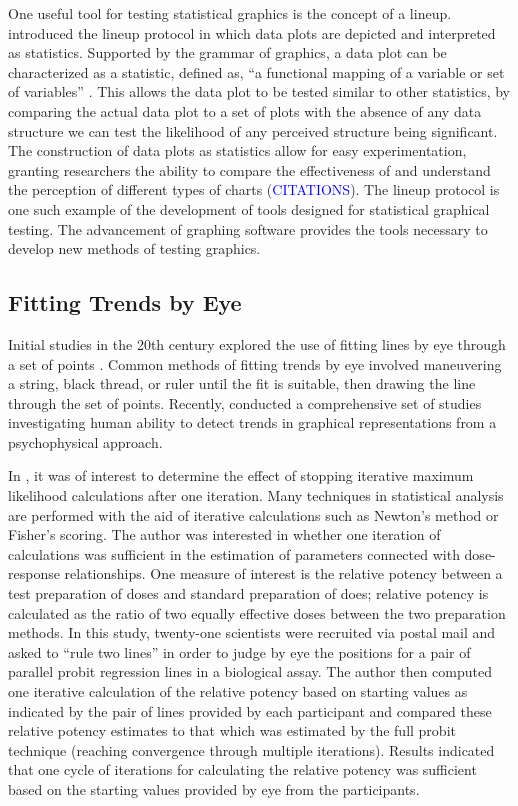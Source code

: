 \documentclass[12pt]{article}
\begin{document}
One useful tool for testing statistical graphics is the concept of a
lineup. \citet{buja2009statistical} introduced the lineup protocol in
which data plots are depicted and interpreted as statistics. Supported
by the grammar of graphics, a data plot can be characterized as a
statistic, defined as, ``a functional mapping of a variable or set of
variables'' \citep{vanderplas2020testing}. This allows the data plot to
be tested similar to other statistics, by comparing the actual data plot
to a set of plots with the absence of any data structure we can test the
likelihood of any perceived structure being significant. The
construction of data plots as statistics allow for easy experimentation,
granting researchers the ability to compare the effectiveness of and
understand the perception of different types of charts
({\textcolor{blue}{CITATIONS}}). The lineup protocol is one such example
of the development of tools designed for statistical graphical testing.
The advancement of graphing software provides the tools necessary to
develop new methods of testing graphics.

\hypertarget{fitting-trends-by-eye}{%
\subsection{Fitting Trends by Eye}\label{fitting-trends-by-eye}}

Initial studies in the 20th century explored the use of fitting lines by
eye through a set of points
\citep{finney1951subjective, mosteller1981eye}. Common methods of
fitting trends by eye involved maneuvering a string, black thread, or
ruler until the fit is suitable, then drawing the line through the set
of points. Recently, \citet{ciccione2021can} conducted a comprehensive
set of studies investigating human ability to detect trends in graphical
representations from a psychophysical approach.

In \citet{finney1951subjective}, it was of interest to determine the
effect of stopping iterative maximum likelihood calculations after one
iteration. Many techniques in statistical analysis are performed with
the aid of iterative calculations such as Newton's method or Fisher's
scoring. The author was interested in whether one iteration of
calculations was sufficient in the estimation of parameters connected
with dose-response relationships. One measure of interest is the
relative potency between a test preparation of doses and standard
preparation of does; relative potency is calculated as the ratio of two
equally effective doses between the two preparation methods. In this
study, twenty-one scientists were recruited via postal mail and asked to
``rule two lines'' in order to judge by eye the positions for a pair of
parallel probit regression lines in a biological assay. The author then
computed one iterative calculation of the relative potency based on
starting values as indicated by the pair of lines provided by each
participant and compared these relative potency estimates to that which
was estimated by the full probit technique (reaching convergence through
multiple iterations). Results indicated that one cycle of iterations for
calculating the relative potency was sufficient based on the starting
values provided by eye from the participants.
\end{document}

